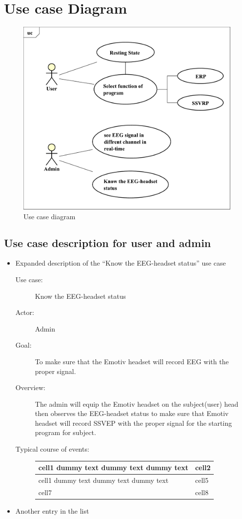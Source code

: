 \section{Use case Diagram}
\begin{figure}[ht]
	\centering
	\includegraphics[scale = 0.5]{chapter4/uc.pdf}
	\caption{Use case diagram}
\end{figure}

\newpage

\subsection{Use case description for user and admin}
\begin{itemize}
	\item Expanded description of the “Know the EEG-headset status” use case
	\begin{description}
		\item [Use case:]Know the EEG-headset status 
		\item [Actor:]Admin 
		\item [Goal:]To make sure that the Emotiv headset will record EEG with the proper signal. 
		\item[Overview:]The admin will equip the Emotiv headset on the subject(user) head then observes the EEG-headset status to make sure that Emotiv headset will record SSVEP with the proper signal for the starting program for subject.	
		\item[Typical course of events:] 
		
		{
			\begin{tabular}{ | m{7cm}| m{7cm} | } 
				\hline
				cell1 dummy text dummy text dummy text& cell2  \\ 
				\hline
				cell1 dummy text dummy text dummy text & cell5  \\ 
				\hline
				cell7 & cell8  \\ 
				\hline
			\end{tabular}
	}
		
	\end{description}
	\item Another entry in the list
\end{itemize}


